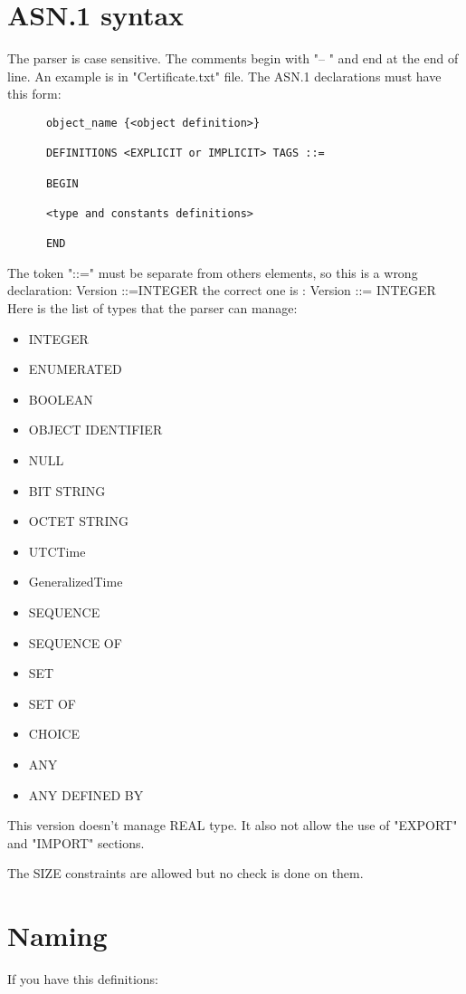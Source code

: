 \documentclass{book}
\begin{document}
\section{ASN.1 syntax}
The parser is case sensitive. The comments begin with "-- " and end at the end of line.
An example is in "Certificate.txt" file.
The ASN.1 declarations must have this form:
      
\begin{verbatim}
      object_name {<object definition>}

      DEFINITIONS <EXPLICIT or IMPLICIT> TAGS ::=

      BEGIN 

      <type and constants definitions>

      END
\end{verbatim}

\par
The token "::=" must be separate from others elements, so this is a wrong declaration:
      Version ::=INTEGER 
the correct one is :   Version ::= INTEGER
Here is the list of types that the parser can manage:
\begin{itemize}

\item      INTEGER
\item      ENUMERATED
\item      BOOLEAN
\item      OBJECT IDENTIFIER
\item      NULL
\item      BIT STRING
\item      OCTET STRING
\item      UTCTime
\item      GeneralizedTime
\item      SEQUENCE
\item      SEQUENCE OF
\item      SET 
\item      SET OF
\item      CHOICE
\item      ANY
\item      ANY DEFINED BY
\end{itemize}

This version doesn't manage REAL type. It also not allow the use of 
"EXPORT" and "IMPORT" sections.

The SIZE constraints are allowed but no check is done on them.



\section{Naming}
If you have this definitions:
\end{document}
